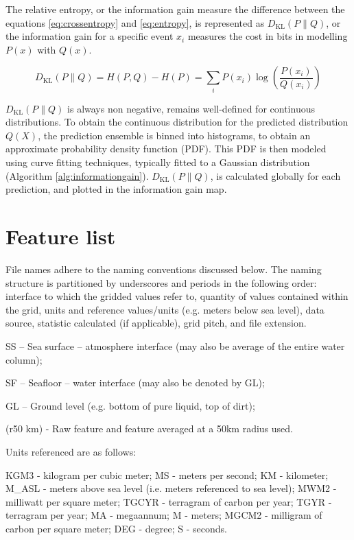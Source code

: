 \documentclass[journal abbreviation, manuscript]{copernicus}
\begin{document}
The relative entropy, or the information gain measure the difference between the equations \ref{eq:crossentropy} and \ref{eq:entropy}, is represented as $D_{\text{KL}}(P \| Q)$,  or the information gain for a specific event \(x_i\) measures the cost in bits in modelling $P(x)$ with $Q(x)$. 

\begin{equation}
    D_{\text{KL}}(P \| Q) = H(P, Q) - H(P) = \sum_i P(x_i) \log\left(\frac{P(x_i)}{Q(x_i)}\right)
\end{equation}


$D_{\text{KL}}(P \| Q)$ is always non negative, remains well-defined for continuous distributions. To obtain the continuous distribution for the predicted distribution $Q(X)$, the prediction ensemble is binned into histograms, to obtain an approximate probability density function (PDF). This PDF is then modeled using curve fitting techniques, typically fitted to a Gaussian distribution (Algorithm \ref{alg:informationgain}). $D_{\text{KL}}(P \| Q)$, is calculated globally for each prediction, and plotted in the information gain map. 



\newpage
\section{Feature list}

File names adhere to the naming conventions discussed below. The naming structure is partitioned by underscores and periods in the following order: interface to which the gridded values refer to, quantity of values contained within the grid, units and reference values/units (e.g. meters below sea level), data source, statistic calculated (if applicable), grid pitch, and file extension.


SS – Sea surface – atmosphere interface (may also be average of the entire water column);

SF – Seafloor – water interface (may also be denoted by GL);

GL   – Ground level (e.g. bottom of pure liquid, top of dirt);

(r50 km) - Raw feature and feature averaged at a 50km radius used.

Units referenced are as follows:

KGM3 - kilogram per cubic meter;
MS - meters per second;
KM - kilometer;
M\_ASL - meters above sea level (i.e. meters referenced to sea level);
MWM2 - milliwatt per square meter;
TGCYR - terragram of carbon per year;
TGYR - terragram per year;
MA - megaannum;
M - meters;
MGCM2 - milligram of carbon per square meter;
DEG - degree;
S - seconds.
\end{document}
